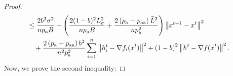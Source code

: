 \documentclass{article}
\newcommand{\alexander}[1]{\todo[inline]{\textbf{Alexander: }#1}}
\newcommand*{\probavailable}{\ensuremath{p_{\textnormal{a}}}}
\newcommand*{\probpairaa}{\ensuremath{p_{\textnormal{aa}}}}
\begin{document}
\begin{proof}
\begin{align*}
    &\leq \frac{2 b^2 \sigma^2}{n \probavailable B} + \left(\frac{2 (1 - b)^2 L_{\sigma}^2}{n \probavailable B} + \frac{2\left(\probavailable - \probpairaa\right) \widehat{L}^2}{n \probavailable^2} \right) \norm{x^{t+1} - x^{t}}^2\\
    &\quad + \frac{2 \left(\probavailable - \probpairaa\right) b^2}{n^2 \probavailable^2} \sum_{i=1}^n \norm{h^t_i - \nabla f_i(x^{t})}^2 + \left(1 - b\right)^2 \norm{h^{t} - \nabla f(x^{t})}^2.
  \end{align*}
  Now, we prove the second inequality:

\end{proof}
\end{document}
